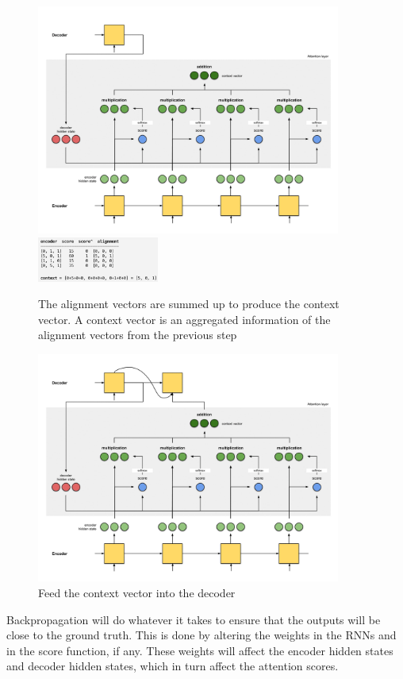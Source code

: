 \documentclass[11pt]{article}
\begin{document}
\begin{figure}[H]
	\centering
	\includegraphics[width=10cm]{seq2seq_attention_sum}
	\includegraphics[width=4cm]{img/seq2seq_attention_sums}
	\caption{The alignment vectors are summed up to produce the context vector. A context vector is an aggregated information of the alignment vectors from the previous step}
\end{figure}
\begin{figure}[H]
	\centering
	\includegraphics[width=10cm]{seq2seq_attention_feed_context_decoder}
	\caption{Feed the context vector into the decoder}
\end{figure}

Backpropagation will do whatever it takes to ensure that the outputs will be close to the ground truth. This is done by altering the weights in the RNNs and in the score function, if any. These weights will affect the encoder hidden states and decoder hidden states, which in turn affect the attention scores.
\end{document}
